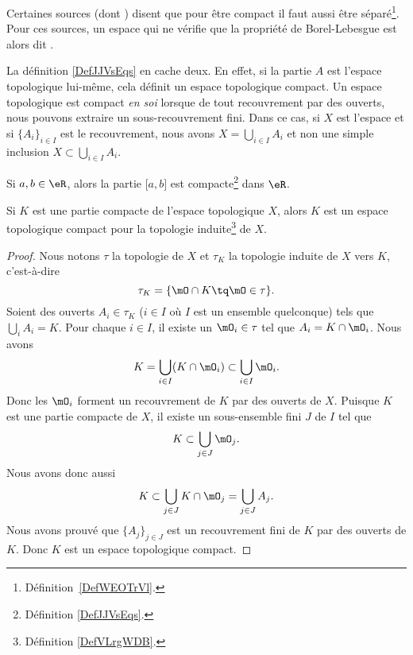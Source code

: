 \begin{remark}
	Certaines sources (dont ) disent que pour être compact il faut aussi être séparé\footnote{Définition~\ref{DefWEOTrVl}.}. Pour ces sources, un espace qui ne vérifie que la propriété de Borel-Lebesgue est alors dit .
\end{remark}

\begin{normaltext}
	La définition \ref{DefJJVsEqs} en cache deux. En effet, si la partie \( A\) est l'espace topologique lui-même, cela définit un espace topologique compact. Un espace topologique est compact \emph{en soi} lorsque de tout recouvrement par des ouverts, nous pouvons extraire un sous-recouvrement fini. Dans ce cas, si \( X\) est l'espace et si \( \{ A_i \}_{i\in I}\) est le recouvrement, nous avons \( X=\bigcup_{i\in I}A_i\) et non une simple inclusion \( X\subset \bigcup_{i\in I}A_i\).
\end{normaltext}

\begin{lemma}       \label{LEMooNNHYooITNbyz}
	Si \( a,b\in \eR\), alors la partie \( \mathopen[ a , b \mathclose]\) est compacte\footnote{Définition \ref{DefJJVsEqs}.} dans \( \eR\).
\end{lemma}

\begin{lemma}       \label{LEMooVYTRooKTIYdn}
	Si \( K\) est une partie compacte de l'espace topologique \( X\), alors \( K\) est un espace topologique compact pour la topologie induite\footnote{Définition \ref{DefVLrgWDB}.} de \( X\).
\end{lemma}

\begin{proof}
	Nous notons \( \tau\) la topologie de \( X\) et \( \tau_K\) la topologie induite de \( X\) vers \( K\), c'est-à-dire
	\begin{equation}
		\tau_K=\{ \mO\cap K\tq \mO\in\tau \}.
	\end{equation}
	Soient des ouverts \( A_i\in \tau_K\) (\( i\in I\) où \( I\) est un ensemble quelconque) tels que \( \bigcup_iA_i=K\). Pour chaque \( i\in I\), il existe un \( \mO_i\in \tau\) tel que \( A_i=K\cap\mO_i\). Nous avons
	\begin{equation}
		K=\bigcup_{i\in I}(K\cap\mO_i)\subset\bigcup_{i\in I}\mO_i.
	\end{equation}
	Donc les \( \mO_i\) forment un recouvrement de \( K\) par des ouverts de \( X\). Puisque \( K\) est une partie compacte de \( X\), il existe un sous-ensemble fini \( J\) de \( I\) tel que
	\begin{equation}
		K\subset\bigcup_{j\in J}\mO_j.
	\end{equation}
	Nous avons donc aussi
	\begin{equation}
		K\subset\bigcup_{j\in J}K\cap\mO_j=\bigcup_{j\in J}A_j.
	\end{equation}
	Nous avons prouvé que \( \{ A_j \}_{j\in J}\) est un recouvrement fini de \( K\) par des ouverts de \( K\). Donc \( K\) est un espace topologique compact.
\end{proof}

